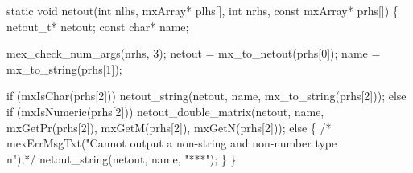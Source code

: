 \nwenddocs{}\endmoddef
static void netout(int nlhs, mxArray* plhs[],
                   int nrhs, const mxArray* prhs[])
\{
    netout_t*   netout;
    const char* name;

    mex_check_num_args(nrhs, 3);
    netout = mx_to_netout(prhs[0]);
    name   = mx_to_string(prhs[1]);

    if (mxIsChar(prhs[2]))
        netout_string(netout, name, mx_to_string(prhs[2]));
    else if (mxIsNumeric(prhs[2]))
        netout_double_matrix(netout, name, mxGetPr(prhs[2]), 
                             mxGetM(prhs[2]), mxGetN(prhs[2]));
    else \{
/*        mexErrMsgTxt("Cannot output a non-string and non-number type\\n");*/
netout_string(netout, name, "***");
    \}
\}

\nwendcode{}

%
%
%
%
%
%
%
\nwdocspar

\nwenddocs{}
